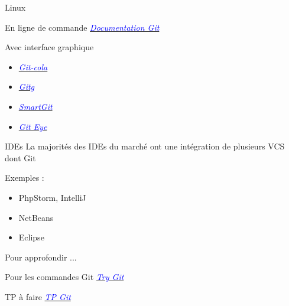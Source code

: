   \begin{frame}{Linux}
  
    \begin{block}{En ligne de commande}
      {
	\href{http://git-scm.com/book/fr/}{\textit{\textcolor{blue}{Documentation Git}}}
      }
      
    \end{block}
      
    \begin{block}{Avec interface graphique} 
    {
      \begin{itemize}
	\item<2>{\href{http://git-cola.github.io/}{\textit{\textcolor{blue}{Git-cola}}}} 	\item<3>{\href{https://wiki.gnome.org/action/show/Apps/Gitg?action=show&redirect=Gitg}{\textit{\textcolor{blue}{Gitg}}}}
	\item<4>{\href{http://www.syntevo.com/smartgithg/}{\textit{\textcolor{blue}{SmartGit}}}}
	\item<5>{\href{http://www.collab.net/giteyeapp}{\textit{\textcolor{blue}{Git Eye}}}} 
      \end{itemize}
    }
      
    \end{block}
    
  
   
  \end{frame}
  
  \begin{frame}{IDEs}
    La majorit\'es des IDEs du march\'e ont une int\'egration de plusieurs VCS dont Git
    {
      \begin{exampleblock}{Exemples :}
	\begin{itemize}
	\item PhpStorm, IntelliJ
	\item NetBeans
	\item Eclipse
	\end{itemize}
      \end{exampleblock}
    }
    

     


   
  \end{frame}

  
  
  
  \begin{frame}{Pour approfondir ...}
	  \begin{block}{Pour les commandes Git}
		  \href{http://try.github.io/}{\textit{\textcolor{blue}{Try Git}}}
	  \end{block}
	  \begin{block}{TP à faire}
		  \href{http://bit.ly/iut-3}{\textit{\textcolor{blue}{TP Git}}}
	  \end{block}
  \end{frame}
